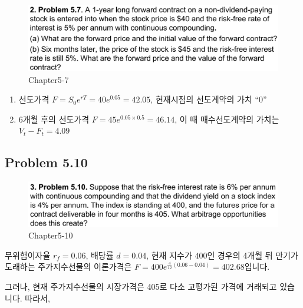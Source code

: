 \documentclass[
  letterpaper,
  DIV=11,
  numbers=noendperiod]{scrreprt}
\begin{document}
\begin{figure}[H]

{\centering \includegraphics{images/선물옵션_5-7.png}

}

\caption{Chapter5-7}

\end{figure}%

\begin{enumerate}
\def\labelenumi{(\alph{enumi})}
\item
  선도가격 \(F=S_0e^{rT}=40e^{0.05}=42.05\), 현재시점의 선도계약의 가치
  ``0''
\item
  6개월 후의 선도가격 \(F=45e^{0.05\times 0.5}=46.14\), 이 때
  매수선도계약의 가치는 \(V_t-F_t=4.09\)
\end{enumerate}

\subsection*{\texorpdfstring{\textbf{Problem
5.10}}{Problem 5.10}}\label{problem-5.10}

\begin{figure}[H]

{\centering \includegraphics{images/선물옵션_5-10.png}

}

\caption{Chapter5-10}

\end{figure}%

무위험이자율 \(r_f=0.06\), 배당률 \(d=0.04\), 현재 지수가 \(400\)인
경우의 4개월 뒤 만기가 도래하는 주가지수선물의 이론가격은
\(F=400e^{\frac{4}{12}(0.06-0.04)}=402.68\)입니다.

그러나, 현재 주가지수선물의 시장가격은 405로 다소 고평가된 가격에
거래되고 있습니다. 따라서,
\end{document}
